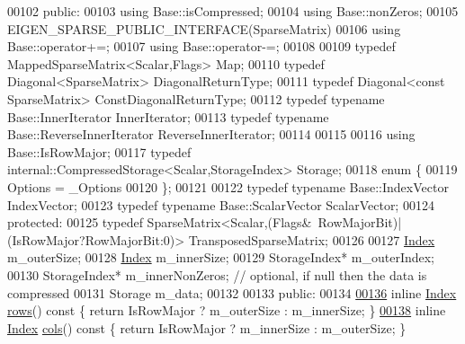 \begin{DoxyCode}
00102   \textcolor{keyword}{public}:
00103     \textcolor{keyword}{using} Base::isCompressed;
00104     \textcolor{keyword}{using} Base::nonZeros;
00105     EIGEN\_SPARSE\_PUBLIC\_INTERFACE(SparseMatrix)
00106     \textcolor{keyword}{using} Base::operator+=;
00107     \textcolor{keyword}{using} Base::operator-=;
00108 
00109     \textcolor{keyword}{typedef} MappedSparseMatrix<Scalar,Flags> Map;
00110     \textcolor{keyword}{typedef} Diagonal<SparseMatrix> DiagonalReturnType;
00111     \textcolor{keyword}{typedef} Diagonal<const SparseMatrix> ConstDiagonalReturnType;
00112     \textcolor{keyword}{typedef} \textcolor{keyword}{typename} Base::InnerIterator InnerIterator;
00113     \textcolor{keyword}{typedef} \textcolor{keyword}{typename} Base::ReverseInnerIterator ReverseInnerIterator;
00114     
00115 
00116     \textcolor{keyword}{using} Base::IsRowMajor;
00117     \textcolor{keyword}{typedef} internal::CompressedStorage<Scalar,StorageIndex> Storage;
00118     \textcolor{keyword}{enum} \{
00119       Options = \_Options
00120     \};
00121 
00122     \textcolor{keyword}{typedef} \textcolor{keyword}{typename} Base::IndexVector IndexVector;
00123     \textcolor{keyword}{typedef} \textcolor{keyword}{typename} Base::ScalarVector ScalarVector;
00124   \textcolor{keyword}{protected}:
00125     \textcolor{keyword}{typedef} SparseMatrix<Scalar,(Flags&~RowMajorBit)|(IsRowMajor?RowMajorBit:0)> TransposedSparseMatrix;
00126 
00127     \hyperlink{namespace_eigen_a62e77e0933482dafde8fe197d9a2cfde}{Index} m\_outerSize;
00128     \hyperlink{namespace_eigen_a62e77e0933482dafde8fe197d9a2cfde}{Index} m\_innerSize;
00129     StorageIndex* m\_outerIndex;
00130     StorageIndex* m\_innerNonZeros;     \textcolor{comment}{// optional, if null then the data is compressed}
00131     Storage m\_data;
00132 
00133   \textcolor{keyword}{public}:
00134     
\hyperlink{group___sparse_core___module_a62e61bb861eee306d5b069ce652b5aa5}{00136}     \textcolor{keyword}{inline} \hyperlink{group___core___module_a554f30542cc2316add4b1ea0a492ff02}{Index} \hyperlink{group___sparse_core___module_a62e61bb861eee306d5b069ce652b5aa5}{rows}()\textcolor{keyword}{ const }\{ \textcolor{keywordflow}{return} IsRowMajor ? m\_outerSize : m\_innerSize; \}
\hyperlink{group___sparse_core___module_aa391750e3c530227e4a5c3c52e959975}{00138}     \textcolor{keyword}{inline} \hyperlink{group___core___module_a554f30542cc2316add4b1ea0a492ff02}{Index} \hyperlink{group___sparse_core___module_aa391750e3c530227e4a5c3c52e959975}{cols}()\textcolor{keyword}{ const }\{ \textcolor{keywordflow}{return} IsRowMajor ? m\_innerSize : m\_outerSize; \}

\end{DoxyCode}
